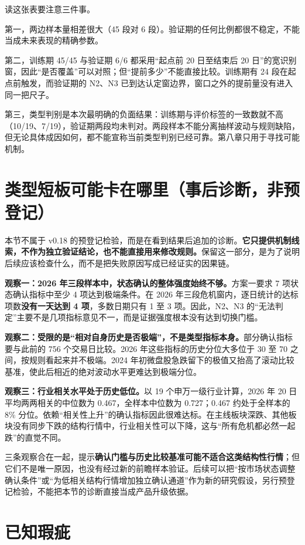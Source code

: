 \documentclass[12pt,a4paper]{ctexart}
\begin{document}
读这张表要注意三件事。

第一，两边样本量相差很大（45 段对 6 段）。验证期的任何比例都很不稳定，不能当成未来表现的精确参数。

第二，训练期 45/45 与验证期 6/6 都采用“起点前 20 日至结束后 20 日”的宽识别窗，因此“是否覆盖”可以对照；但“提前多少”不能直接比较。训练期有 24 段在起点前触发，而验证期的 N2、N3 已到达认定窗边界，窗口之外的提前量没有进入同一把尺子。

第三，类型判别是本次最明确的负面结果：训练期与评价标签的一致数就不高（10/19、7/19），验证期两段均未判对。两段样本不能分离抽样波动与规则缺陷，但无论具体成因如何，都不能宣称当前类型判别已经可靠。第八章只用于寻找可能机制。

\section{类型短板可能卡在哪里（事后诊断，非预登记）}

本节不属于 v0.18 的预登记检验，而是在看到结果后追加的诊断。\textbf{它只提供机制线索，不作为独立验证结论，也不能直接用来修改规则。}保留这一部分，是为了说明后续应该检查什么，而不是把失败原因写成已经证实的因果链。

\textbf{观察一：2026 年三段样本中，状态确认的整体强度始终不够。}方案一要求 7 项状态确认指标中至少 4 项达到极端条件。在 2026 年三段危机窗内，逐日统计的达标项数\textbf{没有一天达到 4 项}，多数日期只有 1 至 3 项。因此，N2、N3 的“无法判定”主要不是几项指标意见不一，而是证据强度根本没有达到切换门槛。

\textbf{观察二：受限的是“相对自身历史是否极端”，不是类型指标本身。}部分确认指标要与此前的 756 个交易日比较。2026 年这些指标的历史分位大多位于 30 至 70 之间，按规则看起来并不极端。2024 年初微盘股急跌留下的极值又抬高了滚动比较基准，使此后相近的绝对波动水平更难达到极端分位。

\textbf{观察三：行业相关水平处于历史低位。}以 19 个申万一级行业计算，2026 年 20 日平均两两相关的中位数为 0.467，全样本中位数为 0.727；0.467 约处于全样本的 8\% 分位。依赖“相关性上升”的确认指标因此很难达标。在主线板块深跌、其他板块没有同步下跌的结构行情中，行业相关性可以下降，这与“所有危机都必然一起跌”的直觉不同。

三条观察合在一起，提示\textbf{确认门槛与历史比较基准可能不适合这类结构性行情}；但它们不是唯一原因，也没有经过新的前瞻样本验证。后续可以把“按市场状态调整确认条件”或“为低相关结构行情增加独立确认通道”作为新的研究假设，另行预登记检验，不能把本节的诊断直接当成产品升级依据。

\section{已知瑕疵}
\end{document}
